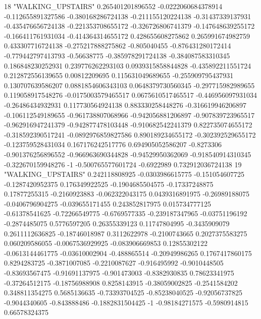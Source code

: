18 "WALKING_UPSTAIRS" 0.265401201896552 -0.0222060684378914 -0.112655891327586 -0.380168286724138 -0.211155120224138 -0.31437339137931 -0.435476656724138 -0.221353708655172 -0.326726806741379 -0.147648639255172 -0.166411761931034 -0.414364314655172 0.428655608275862 0.265991674982759 0.433307716724138 -0.275217888275862 -0.805040455 -0.876431280172414 -0.779442797413793 -0.56638775 -0.385978291724138 -0.384087583310345 0.186848230252931 0.239776262293103 0.0939315858844828 -0.435892211551724 0.212872556139655 0.00812209695 0.115631049689655 -0.255909795437931 0.130707639586207 0.0881854606343103 0.0648379730560345 -0.297715982989655 0.119058917548276 -0.0175003579465517 0.0675610517465517 -0.446956097931034 -0.26486434932931 0.117730564924138 0.883330258448276 -0.316619946206897 -0.106112549189655 -0.961738807068966 -0.942056881206897 -0.907839723965517 -0.962916947241379 -0.942877478103448 -0.910682542241379 0.822735074655172 -0.318592390517241 -0.0892976859827586 0.890189234655172 -0.302392529655172 -0.123759528431034 0.167176242517776 0.694905052586207 -0.8273306 -0.901376256896552 -0.966963690344828 -0.94529950362069 -0.918540914310345 -0.322670159948276 -1 -0.500765577601724 -0.6922989 0.732912036724138
19 "WALKING_UPSTAIRS" 0.242118808925 -0.0303986615775 -0.151054607725 -0.1287420952375 0.176349922525 -0.1904685504575 -0.17337248875 0.17877255315 -0.2160923883 -0.062322043175 0.0439316891975 -0.26989188075 -0.0406796904275 -0.039655171455 0.243852817975 0.015734777125 -0.61378541625 -0.72266549775 -0.6769577335 -0.239187347965 -0.03751196192 -0.2874485075 0.5776597205 0.26355339123 0.11747804995 -0.3435909079 0.2611112636825 -0.18746018987 0.3112622978 -0.2100743665 0.2027375583275 0.060209586055 -0.0067536929925 -0.083906669853 0.12855302122 -0.0613144461775 -0.03610002904 -0.488865514 -0.20949986265 0.1767417860175 0.8294283725 -0.3871007085 -0.2210087627 -0.916495992 -0.9010448505 -0.83693567475 -0.91691137975 -0.901473003 -0.8382930835 0.78623341975 -0.37264512175 -0.18756988908 0.8258143915 -0.38059002825 -0.2541584202 0.348811354275 0.5685136635 -0.73393704525 -0.85238040525 -0.92056737825 -0.9044340605 -0.843888486 -0.1882831504425 -1 -0.98184271575 -0.5980914815 0.66578324375
